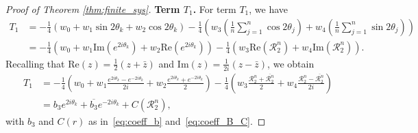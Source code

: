 \documentclass[10pt]{article}
\theoremstyle{definition}
\theoremstyle{definition}
\numberwithin{equation}{section}
\newcommand{\CR}{\mathcal{R}}
\newcommand{\IM}[1]{\mathrm{Im}\left(#1\right)}
\newcommand{\RE}[1]{\mathrm{Re}\left(#1\right)}
\newcommand{\im}[1]{\mathrm{Im} \left(#1\right)}
\newcommand{\re}[1]{\mathrm{Re}\left(#1\right)}
\begin{document}
\begin{proof}[Proof of Theorem \ref{thm:finite_sys}]
    \textbf{Term $T_1$.}
    For term $T_1$, we have
    \begin{equation*}
    \begin{split}
        T_1
        &= -\frac{1}{4}\left(w_0 + w_1 \sin 2 \theta_k + w_2 \cos 2\theta_k\right) -\frac{1}{4} \left(w_3 \left(\frac{1}{n} \sum_{j=1}^n\cos 2\theta_j\right) + w_4 \left(\frac{1}{n} \sum_{j=1}^n\sin 2\theta_j\right)\right)\\
        &= -\frac{1}{4}\left(w_0 + w_1 \im{e^{2i\theta_k}} + w_2 \re{e^{2i\theta_k}}\right) -\frac{1}{4} \left(w_3 \RE{\CR_2^n} + w_4 \IM{\CR_2^n}\right).
    \end{split}
    \end{equation*}
    Recalling that $\re{z} = \frac{1}{2}(z+\bar{z})$ and $\im{z} = \frac{1}{2i}(z-\bar{z})$,
    we obtain
    \begin{equation*}
    \begin{split}
        T_1
        &= -\frac{1}{4}\left(w_0 + w_1 \frac{e^{2i\theta_k}-e^{-2i\theta_k}}{2i} + w_2 \frac{e^{2i\theta_k}+e^{-2i\theta_k}}{2}\right) -\frac{1}{4} \left(w_3 \frac{\CR_2^n+\overline{\CR_2^n}}{2} + w_4 \frac{\CR_2^n-\overline{\CR_2^n}}{2i}\right) \\
        &= b_3e^{2i\theta_k} + \overline{b_3}e^{-2i\theta_k} + C(\CR_2^n),
    \end{split}
    \end{equation*}
    with $b_3$ and $C(r)$ as in~\eqref{eq:coeff_b} and~\eqref{eq:coeff_B_C}.
    

\end{proof}
\end{document}
